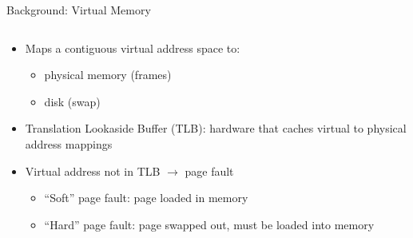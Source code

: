 \documentclass[aspectratio=169]{beamer}
\newcommand{\bi}{\begin{itemize}}
\newcommand{\ei}{\end{itemize}}
\begin{document}
\begin{frame}{Background: Virtual Memory}
\begin{columns}[T]
\begin{column}{0.7\textwidth}
      \bi
    \item Maps a contiguous virtual address space to:
      \bi
    \item physical memory (frames)
    \item disk (swap)
      \ei
    \item Translation Lookaside Buffer (TLB): hardware that caches virtual to physical address mappings
    \item Virtual address not in TLB $\rightarrow$ page fault
      \bi
    \item ``Soft'' page fault: page loaded in memory
    \item ``Hard'' page fault: page swapped out, must be loaded into memory
      \ei
      \ei
    \end{column}
  \end{columns}
\end{frame}
\end{document}
